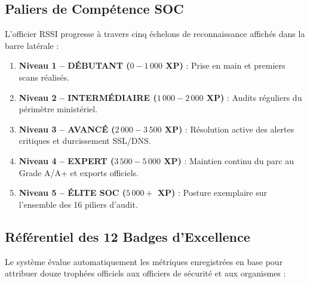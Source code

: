 \subsection{Paliers de Compétence SOC}
L'officier RSSI progresse à travers cinq échelons de reconnaissance affichés dans la barre latérale :
\begin{enumerate}
    \item \textbf{Niveau 1 -- DÉBUTANT ($0 - 1\,000$ XP)} : Prise en main et premiers scans réalisés.
    \item \textbf{Niveau 2 -- INTERMÉDIAIRE ($1\,000 - 2\,000$ XP)} : Audits réguliers du périmètre ministériel.
    \item \textbf{Niveau 3 -- AVANCÉ ($2\,000 - 3\,500$ XP)} : Résolution active des alertes critiques et durcissement SSL/DNS.
    \item \textbf{Niveau 4 -- EXPERT ($3\,500 - 5\,000$ XP)} : Maintien continu du parc au Grade A/A+ et exports officiels.
    \item \textbf{Niveau 5 -- ÉLITE SOC ($5\,000+$ XP)} : Posture exemplaire sur l'ensemble des 16 piliers d'audit.
\end{enumerate}

\subsection{Référentiel des 12 Badges d'Excellence}
Le système évalue automatiquement les métriques enregistrées en base pour attribuer douze trophées officiels aux officiers de sécurité et aux organismes :

